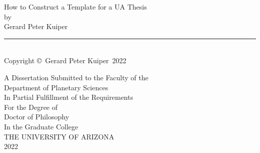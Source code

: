 \documentclass[12pt]{report} %
\newcommand{\CompleteTitle}{How to Construct a Template for a UA Thesis} %
\newcommand{\FullName}{Gerard Peter Kuiper} %
\newcommand{\DegreeType}{Doctor of Philosophy} %
\newcommand{\DepartmentName}{Department of Planetary Sciences} %
\newcommand{\DegreeYear}{2022} %
\begin{document}
\nobibliography* %



\thispagestyle{empty} %

\null
\vfill

\begin{center}
\MakeUppercase\CompleteTitle \\ 
\vspace*{1.5em}
by\\
\vspace*{1.5em}
\FullName \\
\vspace*{2em}

\rule{3in}{1pt}\\
\vspace*{-1em}
{\small Copyright \copyright\ \FullName\ \DegreeYear} \\
\vspace*{2em}

A Dissertation Submitted to the Faculty of the\\
\vspace*{1.5em}
\MakeUppercase\DepartmentName \\
\vspace*{1.5em}
In Partial Fulfillment of the Requirements\\
\vspace*{0.5em}
For the Degree of\\
\vspace*{1.5em}
\MakeUppercase\DegreeType \\
\vspace*{1.5em}
In the Graduate College\\
\vspace*{1.5em}
THE UNIVERSITY OF ARIZONA\\
\vspace*{3em}
\DegreeYear
\end{center}

\vfill %





\end{document}
